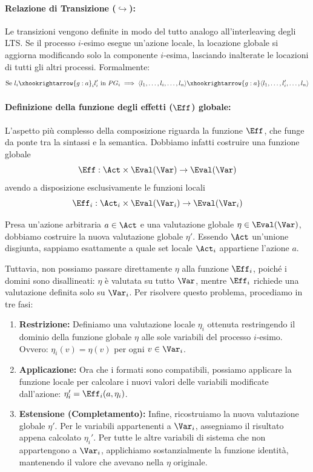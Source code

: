 \paragraph{Relazione di Transizione (\(\hookrightarrow\)):}
Le transizioni vengono definite in modo del tutto analogo all'interleaving degli LTS\@. Se il processo \(i\)-esimo esegue un'azione locale, la locazione globale si aggiorna modificando solo la componente \(i\)-esima, lasciando inalterate le locazioni di tutti gli altri processi. Formalmente:
\[
  \text{Se } l_i \xhookrightarrow{g:a}_i l_i' \text{ in } PG_i \implies \langle l_1, \ldots, l_i, \ldots, l_n \rangle \xhookrightarrow{g:a} \langle l_1, \ldots, l_i', \ldots, l_n \rangle
\]

\paragraph{Definizione della funzione degli effetti (\(\Eff\)) globale:}
L'aspetto più complesso della composizione riguarda la funzione \(\Eff\), che funge da ponte tra la sintassi e la semantica. Dobbiamo infatti costruire una funzione globale
\[ \Eff : \Act \times \Eval(\Var) \to \Eval(\Var) \]
avendo a disposizione esclusivamente le funzioni locali
\[ \Eff_i : \Act_i \times \Eval(\Var_i) \to \Eval(\Var_i) \]

Presa un'azione arbitraria \(a \in \Act\) e una valutazione globale \(\eta \in \Eval(\Var)\), dobbiamo costruire la nuova valutazione globale \(\eta'\). Essendo \(\Act\) un'unione disgiunta, sappiamo esattamente a quale set locale \(\Act_i\) appartiene l'azione \(a\).

Tuttavia, non possiamo passare direttamente \(\eta\) alla funzione \(\Eff_i\), poiché i domini sono disallineati: \(\eta\) è valutata su tutto \(\Var\), mentre \(\Eff_i\) richiede una valutazione definita solo su \(\Var_i\).
Per risolvere questo problema, procediamo in tre fasi:
\begin{enumerate}
  \item \textbf{Restrizione:} Definiamo una valutazione locale \(\eta_i\) ottenuta restringendo il dominio della funzione globale \(\eta\) alle sole variabili del processo \(i\)-esimo. Ovvero: \(\eta_i(v) = \eta(v)\) per ogni \(v \in \Var_i\).
  \item \textbf{Applicazione:} Ora che i formati sono compatibili, possiamo applicare la funzione locale per calcolare i nuovi valori delle variabili modificate dall'azione: \(\eta_i' = \Eff_i(a, \eta_i)\).
  \item \textbf{Estensione (Completamento):} Infine, ricostruiamo la nuova valutazione globale \(\eta'\). Per le variabili appartenenti a \(\Var_i\), assegniamo il risultato appena calcolato \(\eta_i'\). Per tutte le altre variabili di sistema che non appartengono a \(\Var_i\), applichiamo sostanzialmente la funzione identità, mantenendo il valore che avevano nella \(\eta\) originale.
\end{enumerate}

